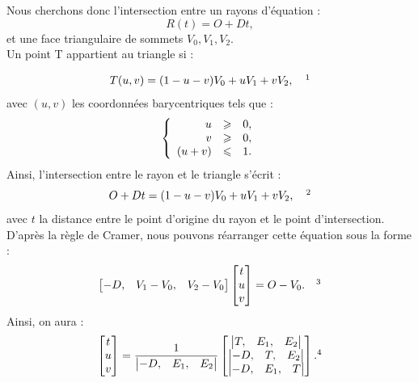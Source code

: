 Nous cherchons donc l'intersection entre un rayons d'équation : 
\begin{equation}
R(t) = O + Dt,
\end{equation}
%
et une face triangulaire de sommets $ V_0, V_1, V_2$. \\

Un point T appartient au triangle si : 

\begin{equation} \label{eq_2moller}
T(u,v) = (1-u-v)V_0 + uV_1 + vV_2, \ \ \ \footnotemark
\end{equation}
%
avec $(u,v)$ les coordonnées barycentriques tels que :
\begin{equation}
   \left \{
   \begin{array}{r c l}
u & \geqslant & 0,  \\
v & \geqslant & 0,  \\
(u+v) & \leqslant & 1.
   \end{array}
   \right .
\end{equation}
%
Ainsi, l'intersection entre le rayon et le triangle s'écrit :
\begin{equation}
O + Dt = (1-u-v)V_0 + uV_1 + vV_2, \ \ \ \footnotemark
\end{equation}
%
avec $t$ la distance entre le point d'origine du rayon et le point d'intersection. D'après la règle de Cramer, nous pouvons réarranger cette équation sous la forme :
%
\begin{equation}
	\begin{bmatrix}
 	  -D, & V_1-V_0, & V_2-V_0
	\end{bmatrix}
	\begin{bmatrix}
 	 t \\
	 u \\
	 v
	\end{bmatrix}
	= O-V_0.
	\ \ \ \footnotemark
\end{equation}
%
Ainsi, on aura :
\begin{equation}
	\begin{bmatrix}
 	 t \\
	 u \\
	 v
	\end{bmatrix}
	=
	\frac{1}{
	\begin{vmatrix}
 	  -D, & E_1, & E_2
	\end{vmatrix}
	}
	\begin{bmatrix}
 	 	\begin{vmatrix}
 		  T, & E_1, & E_2
		\end{vmatrix} \\
 	 	\begin{vmatrix}
 		  -D, & T, & E_2
		\end{vmatrix} \\
 	 	\begin{vmatrix}
 		  -D, & E_1, & T
		\end{vmatrix}
	\end{bmatrix}	.
	\footnotemark
\end{equation}
